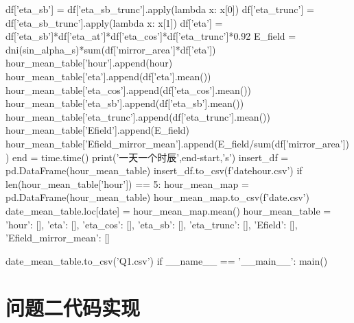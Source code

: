 \documentclass{article}
\numberwithin{equation}{subsection}
\begin{document}
\begin{python}
        df['eta_sb'] = df['eta_sb_trunc'].apply(lambda x: x[0])
        df['eta_trunc'] = df['eta_sb_trunc'].apply(lambda x: x[1])
        df['eta'] = df['eta_sb']*df['eta_at']*df['eta_cos']*df['eta_trunc']*0.92
        E_field = dni(sin_alpha_s)*sum(df['mirror_area']*df['eta'])
        hour_mean_table['hour'].append(hour)
        hour_mean_table['eta'].append(df['eta'].mean())
        hour_mean_table['eta_cos'].append(df['eta_cos'].mean())
        hour_mean_table['eta_sb'].append(df['eta_sb'].mean())
        hour_mean_table['eta_trunc'].append(df['eta_trunc'].mean())
        hour_mean_table['Efield'].append(E_field)
        hour_mean_table['Efield_mirror_mean'].append(E_field/sum(df['mirror_area']))
        end = time.time()
        print('一天一个时辰',end-start,'s')
        insert_df = pd.DataFrame(hour_mean_table)
        insert_df.to_csv(f'{date}{hour}.csv')
        if len(hour_mean_table['hour']) == 5:
            hour_mean_map = pd.DataFrame(hour_mean_table)
            hour_mean_map.to_csv(f'{date}.csv')
            date_mean_table.loc[date] = hour_mean_map.mean()
            hour_mean_table = {'hour': [], 'eta': [], 'eta_cos': [], 'eta_sb': [], 'eta_trunc': [], 'Efield': [],
                       'Efield_mirror_mean': []}

    date_mean_table.to_csv('Q1.csv')
if __name__ == '__main__':
    main()
\end{python}

\section{问题二代码实现}
\end{document}
